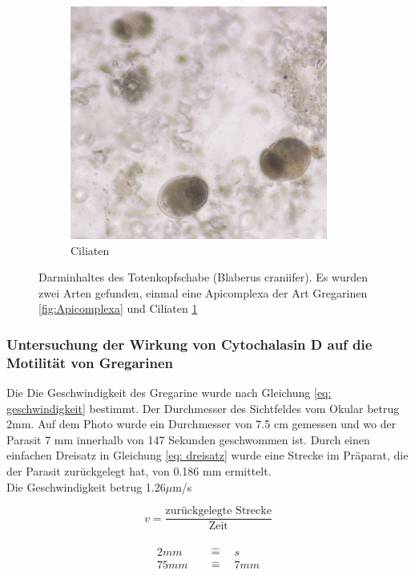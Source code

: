 \documentclass[oneside,10pt,a4paper]{report}
\begin{document}
\begin{figure}[H]
\begin{subfigure}[b]{0.5\textwidth}
							\includegraphics[width=\textwidth]{ciliaten.jpg}
							\caption{Ciliaten}
							\label{fig: Ciliaten}
						\end{subfigure}
						\caption{Darminhaltes des Totenkopfschabe (Blaberus craniifer). Es wurden zwei Arten gefunden, einmal eine Apicomplexa der Art Gregarinen \ref{fig:Apicomplexa} und Ciliaten \ref{fig: Ciliaten}}
						\label{fig: Blaberus_darm}
					\end{figure}
					
					

			\subsubsection{Untersuchung der Wirkung von Cytochalasin D auf die Motilität von Gregarinen}
				Die Die Geschwindigkeit des Gregarine wurde nach Gleichung \ref{eq: geschwindigkeit} bestimmt. Der Durchmesser des Sichtfeldes vom Okular betrug 2mm. Auf dem Photo wurde ein Durchmesser von 7.5 cm gemessen und wo der Parasit 7 mm innerhalb von 147 Sekunden geschwommen ist. Durch einen einfachen Dreisatz in Gleichung \ref{eq: dreisatz} wurde eine Strecke im Präparat, die der Parasit zurückgelegt hat, von 0.186 mm ermittelt.\\
				Die Geschwindigkeit betrug 1.26$\mu$m/s
				
				\begin{equation}\label{eq: geschwindigkeit}
					v = \frac{\text{zurückgelegte Strecke}}{\text{Zeit}}
				\end{equation}
				\\
				\begin{equation}\label{eq: dreisatz}
					\begin{split}
						2 mm &\quad\widehat{=}\quad s\\
						75 mm  &\quad\widehat{=}\quad 7 mm
					\end{split}
				\end{equation}
				
\end{document}
